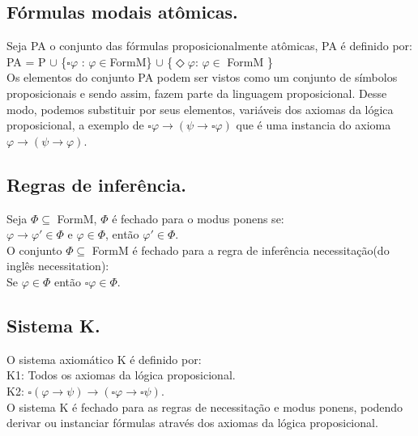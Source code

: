 \documentclass[12pt]{report}
\begin{document}
\subsection{Fórmulas modais atômicas.}%
\hspace{0.5cm} Seja PA o conjunto das fórmulas proposicionalmente atômicas, PA é definido por:\\
PA = P $\cup$ \{$\square \varphi $ : $\varphi \in $FormM\} $\cup $ \{$\Diamond \varphi $: $\varphi \in $ FormM \}\\
\indent Os elementos do conjunto PA podem ser vistos como um conjunto de símbolos proposicionais e sendo assim, fazem parte da linguagem proposicional. Desse modo, podemos substituir por seus elementos, variáveis dos axiomas da lógica proposicional, a exemplo de $\square \varphi \rightarrow (\psi \rightarrow \square \varphi )$ que é uma instancia do axioma $ \varphi \rightarrow (\psi \rightarrow  \varphi )$.
\subsection {Regras de inferência.}%
\hspace{0.5cm} Seja $\Phi\subseteq $ FormM, $\Phi$ é fechado para o modus ponens se:\\
$\varphi \rightarrow \varphi ' \in \Phi $ e $\varphi \in \Phi $, então $\varphi '\in \Phi $.\\
\indent O conjunto $\Phi \subseteq $ FormM é fechado para a regra de inferência necessitação(do inglês necessitation):\\
Se $\varphi \in \Phi $ então $\square \varphi \in  \Phi $.
\subsection{Sistema K.}
\hspace{0.5cm} O sistema axiomático K é definido por:\\
K1: Todos os axiomas da lógica proposicional.\\
K2: $\square (\varphi \rightarrow \psi )\rightarrow (\square \varphi \rightarrow \square \psi )$. \\
\indent O sistema K é fechado para as regras de necessitação e modus ponens, podendo derivar ou instanciar fórmulas através dos axiomas da lógica proposicional.
\end{document}
